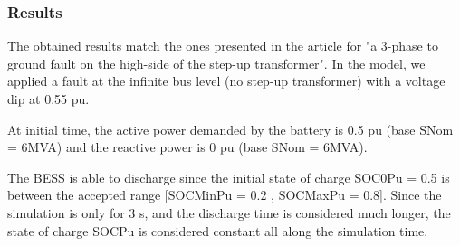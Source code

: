 \documentclass[a4paper, 12pt]{report}
\begin{document}
\subsubsection{Results}
The obtained results match the ones presented in the article for "a 3-phase to ground fault on the high-side of the step-up transformer". In the model, we applied a fault at the infinite bus level (no step-up transformer) with a voltage dip at 0.55 pu.


At initial time, the active power demanded by the battery is 0.5 pu (base SNom = 6MVA) and the reactive power is 0 pu (base SNom = 6MVA).

The BESS is able to discharge since the initial state of charge SOC0Pu = 0.5 is between the accepted range [SOCMinPu = 0.2 , SOCMaxPu = 0.8]. Since the simulation is only for 3 s, and the discharge time is considered much longer, the state of charge SOCPu is considered constant all along the simulation time.
\end{document}
